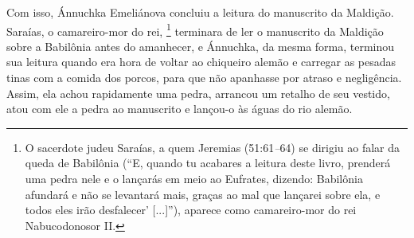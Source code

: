 Com isso, Ánnuchka Emeliánova concluiu a leitura do manuscrito da
Maldição. Saraías, o camareiro-mor do rei, \footnote{O sacerdote judeu
  Saraías, a quem Jeremias (51:61\emph{--}64) se dirigiu ao falar da
  queda de Babilônia (``E, quando tu acabares a leitura deste livro,
  prenderá uma pedra nele e o lançarás em meio ao Eufrates, dizendo:
  Babilônia afundará e não se levantará mais, graças ao mal que lançarei
  sobre ela, e todos eles irão desfalecer' {[}...{]}''), aparece como
  camareiro-mor do rei Nabucodonosor II.} terminara de ler o manuscrito
da Maldição sobre a Babilônia antes do amanhecer, e Ánnuchka, da mesma
forma, terminou sua leitura quando era hora de voltar ao chiqueiro
alemão e carregar as pesadas tinas com a comida dos porcos, para que não
apanhasse por atraso e negligência. Assim, ela achou rapidamente uma
pedra, arrancou um retalho de seu vestido, atou com ele a pedra ao
manuscrito e lançou-o às águas do rio alemão.

